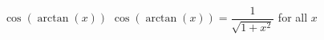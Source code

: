  {$\cos \left( \arctan \left( x \right) \right)$ }
{ $\cos \left( \arctan \left( x \right) \right) = \dfrac{1}{\sqrt{1 + x^{2}}}$ for all $x$}
